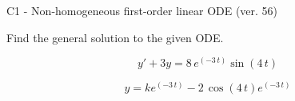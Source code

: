\begin{exercise}
  \begin{exerciseTitle}C1 - Non-homogeneous first-order linear ODE (ver. 56)\end{exerciseTitle}
  \begin{exerciseStatement}
    
Find the general solution to the given ODE.

    
\[y'+3y= 8 \, e^{\left(-3 \, t\right)} \sin\left(4 \, t\right)\]

  \end{exerciseStatement}
  \begin{exerciseAnswer}
    
\[y= k e^{\left(-3 \, t\right)} - 2 \, \cos\left(4 \, t\right) e^{\left(-3 \, t\right)}\]

  \end{exerciseAnswer}
\end{exercise}